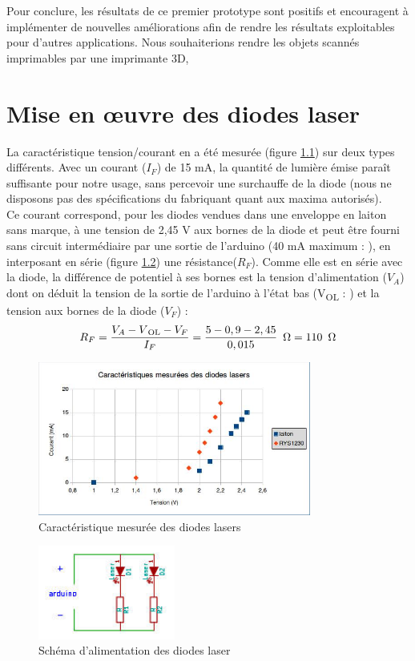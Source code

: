 \documentclass[a4paper,10pt]{report}
\begin{document}
Pour conclure, les résultats de ce premier prototype sont positifs et encouragent à implémenter de nouvelles améliorations afin de rendre les résultats exploitables pour d'autres applications. Nous souhaiterions rendre les objets scannés imprimables par une imprimante 3D, 

\newpage
\appendix

\chapter{Mise en \oe uvre des diodes laser}\label{diodes-laser}
La caractéristique tension/courant en a été mesurée (figure \ref{laser_caracteristique}) sur deux types différents.
Avec un courant ($I_F$) de 15 mA, la quantité de lumière émise paraît suffisante pour notre usage, sans percevoir une surchauffe de la diode (nous ne disposons pas des spécifications du fabriquant quant aux maxima autorisés).\\
Ce courant correspond, pour les diodes vendues dans une enveloppe en laiton sans marque, à une tension de 2,45 V aux bornes de la diode et peut être fourni sans circuit intermédiaire par une sortie de l'arduino (40 mA maximum :  \cite[p.~313]{ATmega}), en interposant en série (figure \ref{laser_circuit}) une résistance($R_F$). Comme elle est en série avec la diode, la différence de potentiel à ses bornes est la tension d'alimentation ($V_A$) dont on déduit la tension de la sortie de l'arduino à l'état bas (V\textsubscript{OL} : \cite[p.~313]{ATmega}) et la tension aux bornes de la diode ($V_F$) :
\begin{equation}
R_F = \frac{V_A-V\textsubscript{OL}-V_F}{I_F} = \frac{5-0,9-2,45}{0,015} \enspace \Omega = 110 \enspace \Omega
\end{equation}

\begin{figure}[h!]
\centering
\includegraphics[width=0.8\textwidth]{Caracteristique.jpg}
\caption{Caractéristique mesurée des diodes lasers}
\label{laser_caracteristique}
\end{figure}
\begin{figure}[h!]
\centering
\includegraphics[width=0.4\textwidth]{circuit2lasers.jpg}
\caption{Schéma d'alimentation des diodes laser}
\label{laser_circuit}
\end{figure}
\newpage
\end{document}
